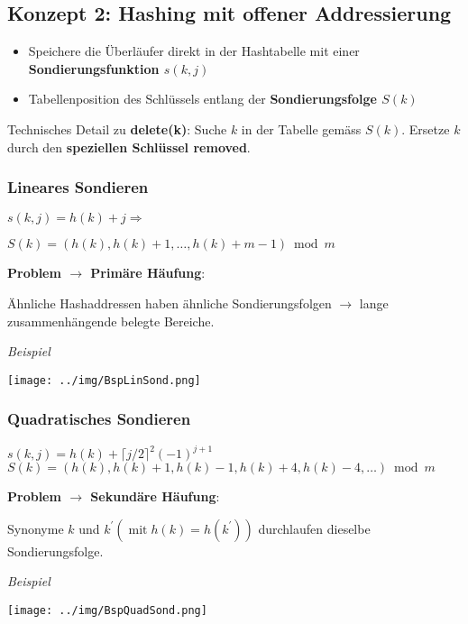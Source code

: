 \documentclass[german]{latex4ei/latex4ei_sheet}
\begin{document}
\begin{sectionbox}
\subsection{Konzept 2: Hashing mit offener Addressierung}\par\smallskip
\begin{itemize}
    \item Speichere die Überläufer direkt in der Hashtabelle mit einer \textbf{Sondierungsfunktion $s(k,j)$}
    \item Tabellenposition des Schlüssels entlang der \textbf{Sondierungsfolge $S(k)$}
\end{itemize}\par\smallskip
Technisches Detail zu \textbf{delete(k)}: Suche $k$ in der Tabelle gemäss $S(k)$. Ersetze $k$ durch den \textbf{speziellen Schlüssel removed}.\par\vspace{7px}

\subsubsection{Lineares Sondieren}\par\smallskip
\begin{center}
    $s(k, j)=h(k)+j \Rightarrow$ \par $S(k)=(h(k), h(k)+1, \ldots, h(k)+m-1) \bmod m$
\end{center}\par\smallskip
\textbf{Problem $\rightarrow$ Primäre Häufung}:\par Ähnliche Hashaddressen haben ähnliche Sondierungsfolgen $\rightarrow$ lange zusammenhängende belegte Bereiche.\par\smallskip
\textit{Beispiel}\par
\begin{center}
    \texttt{[image: ../img/BspLinSond.png]}
\end{center}\vspace{7px}

\subsubsection{Quadratisches Sondieren}\par\smallskip
\begin{center}
    $s(k, j)=h(k)+\lceil j / 2\rceil^{2}(-1)^{j+1}$
    $S(k)=(h(k), h(k)+1, h(k)-1, h(k)+4, h(k)-4, \ldots) \bmod m$
\end{center}\par\smallskip
\textbf{Problem $\rightarrow$ Sekundäre Häufung}:\par Synonyme $k$ und $k^{\prime}\left(\operatorname{mit} h(k)=h\left(k^{\prime}\right)\right)$ durchlaufen dieselbe Sondierungsfolge.\par\smallskip
\textit{Beispiel}\par
\begin{center}
    \texttt{[image: ../img/BspQuadSond.png]}
\end{center}\vspace{7px}


\end{sectionbox}
\end{document}
